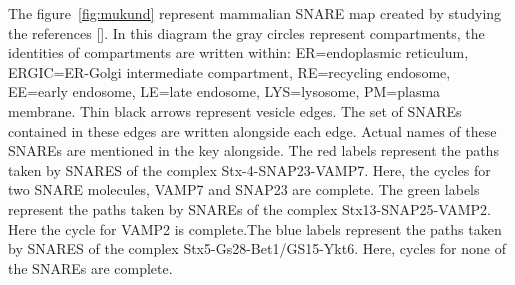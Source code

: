 The figure~\ref{fig:mukund} represent mammalian SNARE map created by studying the references []. In this diagram the gray circles represent compartments, the identities of compartments are
written within: ER=endoplasmic reticulum, ERGIC=ER-Golgi intermediate compartment,
RE=recycling endosome, EE=early endosome, LE=late endosome, LYS=lysosome, PM=plasma
membrane. Thin black arrows represent vesicle edges.
The set of SNAREs contained in these edges are written alongside each edge. Actual names
of these SNAREs are mentioned in the key alongside. The red labels represent the paths taken by
SNARES of the complex Stx-4-SNAP23-VAMP7. Here, the cycles for two SNARE molecules,
VAMP7 and SNAP23 are complete. The green labels represent the paths taken by SNAREs of the
complex Stx13-SNAP25-VAMP2. Here the cycle for VAMP2 is complete.The blue labels represent
the paths taken by SNARES of the complex Stx5-Gs28-Bet1/GS15-Ykt6. Here, cycles for none of
the SNAREs are complete. 

